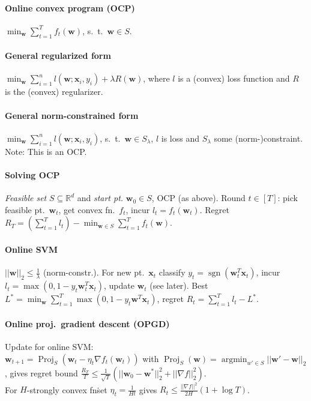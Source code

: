 \documentclass[9pt]{scrartcl}
\DeclareMathOperator{\sign}{sgn}
\DeclareMathOperator{\argmin}{argmin}
\DeclareMathOperator{\Proj}{Proj}
\newcommand{\R}{\mathbb{R}}
\begin{document}
\begin{twocolumn}
\paragraph{Online convex program (OCP)} $\min_{\bm w} \sum_{t=1}^{T} f_t(\bm w)$, s.\ t.\ $\bm w \in S$.
\paragraph{General regularized form} $\min_{\bm w} \sum_{i=1}^{n} l(\bm w; \bm x_i, y_i) + \lambda R(\bm w)$, where $l$ is a (convex) loss function and $R$ is the (convex) regularizer.
\paragraph{General norm-constrained form} $\min_{\bm w} \sum_{i=1}^{n} l(\bm w; \bm x_i, y_i)$, s.\ t.\ $\bm w \in S_\lambda$, $l$ is loss and $S_\lambda$ some (norm-)constraint. Note: This is an OCP.

\paragraph{Solving OCP}
\emph{Feasible set} $S \subseteq \R^d$ and \emph{start pt.} $\bm w_0 \in S$, OCP (as above).
Round $t \in [T]$: pick feasible pt.\ $\bm w_t$, get convex fn.\ $f_t$, incur $l_t = f_t(\bm w_t)$.
Regret $R_T = (\sum_{t=1}^{T} l_t) - \min_{\bm w \in S}\sum_{t=1}^{T}f_t(\bm w)$.

\paragraph{Online SVM}
$||\bm w||_2 \leq \frac{1}{\lambda}$ (norm-constr.). For new pt.\ $\bm x_t$ classify $y_t = \sign(\bm w_t^T \bm x_t)$,
incur $l_t = \max(0,1-y_t \bm w_t^T \bm x_t)$, update $\bm w_t$ (see later).
Best $L^* = \min_{\bm w}\sum_{t=1}^{T}\max(0,1-y_t \bm w^T \bm x_t)$, regret $R_t = \sum_{t=1}^{T} l_t - L^*$.

\paragraph{Online proj.\ gradient descent (OPGD)}
Update for online SVM: \\
$\bm w_{t+1} = \Proj_S(\bm w_t-\eta_t\nabla f_t(\bm w_t))$ with $\Proj_S(\bm w) = \argmin_{w'\in S} ||\bm w'-\bm w||_2$, gives regret bound $\frac{R_T}{T}\leq\frac{1}{\sqrt{T}}(||\bm w_0-\bm w^*||_2^2+||\nabla f||_2^2)$. \\
For $H$-strongly convex fn\. set $\eta_t = \frac{1}{Ht}$ gives $R_t \leq \frac{||\nabla f||^2}{2H}(1+\log T)$.


\end{twocolumn}
\end{document}
